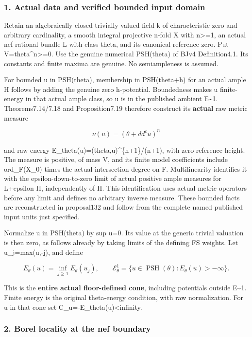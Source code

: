 \documentclass[
  10pt,
]{article}
\begin{document}
\subsubsection{1. Actual data and verified bounded input
domain}\label{actual-data-and-verified-bounded-input-domain}

Retain an algebraically closed trivially valued field k of
characteristic zero and arbitrary cardinality, a smooth integral
projective n-fold X with n\textgreater=1, an actual nef rational bundle
L with class theta, and its canonical reference zero. Put
V=theta\^{}n\textgreater=0. Use the genuine numerical PSH(theta) of BJv4
Definition4.1. Its constants and finite maxima are genuine. No
semiampleness is assumed.

For bounded u in PSH(theta), membership in PSH(theta+h) for an actual
ample H follows by adding the genuine zero h-potential. Boundedness
makes u finite-energy in that actual ample class, so u is in the
published ambient E\textasciitilde1. Theorems7.14/7.18 and
Proposition7.19 therefore construct its \textbf{actual} raw metric
measure

\[\nu(u)=(\theta+dd^cu)^n\]

and raw energy E\_theta(u)=(theta,u)\^{}\{n+1\}/(n+1), with zero
reference height. The measure is positive, of mass V, and its finite
model coefficients include ord\_F(X\_0) times the actual intersection
degree on F. Multilinearity identifies it with the epsilon-down-to-zero
limit of actual positive ample measures for L+epsilon H, independently
of H. This identification uses actual metric operators before any limit
and defines no arbitrary inverse measure. These bounded facts are
reconstructed in proposal132 and follow from the complete named
published input units just specified.

Normalize u in PSH(theta) by sup u=0. Its value at the generic trivial
valuation is then zero, as follows already by taking limits of the
defining FS weights. Let u\_j=max(u,-j), and define

\[E_\theta(u)=\inf_{j\geq1}E_\theta(u_j),\qquad
\mathcal E^1_\theta=\{u\in\operatorname{PSH}(\theta):E_\theta(u)>-\infty\}.\]

This is the \textbf{entire actual floor-defined cone}, including
potentials outside E\textasciitilde1. Finite energy is the original
theta-energy condition, with raw normalization. For u in that cone set
C\_u=-E\_theta(u)\textless infinity.

\subsubsection{2. Borel locality at the nef
boundary}\label{borel-locality-at-the-nef-boundary}
\end{document}
